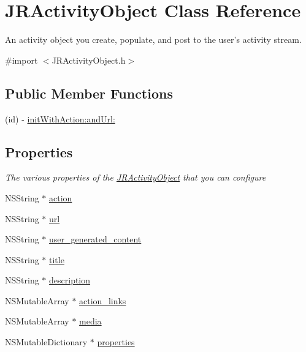 \hypertarget{interface_j_r_activity_object}{
\section{JRActivityObject Class Reference}
\label{interface_j_r_activity_object}
}


An activity object you create, populate, and post to the user's activity stream.  




{\ttfamily \#import $<$JRActivityObject.h$>$}

\subsection*{Public Member Functions}
\begin{DoxyCompactItemize}
\item 
(id) -\/ \hyperlink{interface_j_r_activity_object_a61195dc95162d1136d41af3a5f15fe2d}{initWithAction:andUrl:}
\end{DoxyCompactItemize}
\subsection*{Properties}
\begin{Indent}{\bf }\par
{\em \label{_amgrpd41d8cd98f00b204e9800998ecf8427e}
 The various properties of the \hyperlink{interface_j_r_activity_object}{JRActivityObject} that you can configure }\begin{DoxyCompactItemize}
\item 
NSString $\ast$ \hyperlink{interface_j_r_activity_object_ac7f87878433a7d69fc5c8677fc317d6a}{action}
\item 
NSString $\ast$ \hyperlink{interface_j_r_activity_object_a113d240b8b15e625fb0005fbffd00c17}{url}
\item 
NSString $\ast$ \hyperlink{interface_j_r_activity_object_a965d03730324bcda4374450ad648505b}{user\_\-generated\_\-content}
\item 
NSString $\ast$ \hyperlink{interface_j_r_activity_object_ae64ba976e73c3926a04c46ba0aeba583}{title}
\item 
NSString $\ast$ \hyperlink{interface_j_r_activity_object_a35d4fcb4e1aaa9d6325333228104604f}{description}
\item 
NSMutableArray $\ast$ \hyperlink{interface_j_r_activity_object_aa5c629e1c3b8306b2532ab647f7f6ec5}{action\_\-links}
\item 
NSMutableArray $\ast$ \hyperlink{interface_j_r_activity_object_a2e4ff78f83d0f353f8e0c17ed48ce0ab}{media}
\item 
NSMutableDictionary $\ast$ \hyperlink{interface_j_r_activity_object_a1acf84854d275510685a1f2066061c4e}{properties}
\end{DoxyCompactItemize}
\end{Indent}


